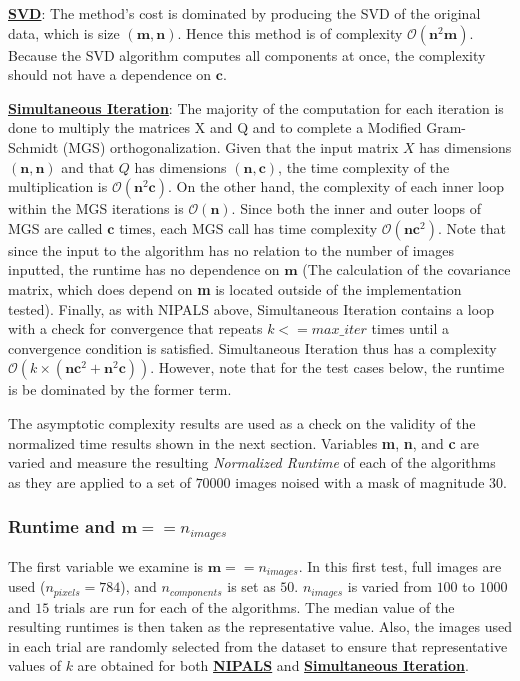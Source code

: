 \documentclass[12pt]{article}
\begin{document}
\textbf{\hyperref[3.2]{SVD}}: The method's cost is dominated by producing the SVD of the original data, which is size $(\textbf{m}, \textbf{n})$. Hence this method is of complexity $\mathcal{O}(\textbf{n}^2 \textbf{m})$. Because the SVD algorithm computes all components at once, the complexity should not have a dependence on $\textbf{c}$.

\textbf{\hyperref[3.3]{Simultaneous Iteration}}: The majority of the computation for each iteration is done to multiply the matrices X and Q and to complete a Modified Gram-Schmidt (MGS) orthogonalization. Given that the input matrix $X$ has dimensions $(\textbf{n}, \textbf{n})$ and that $Q$ has dimensions $(\textbf{n}, \textbf{c})$, the time complexity of the multiplication is $\mathcal{O}(\textbf{n}^2\textbf{c}).$ On the other hand, the complexity of each inner loop within the MGS iterations is $\mathcal{O}(\textbf{n})$. Since both the inner and outer loops of MGS are called $\textbf{c}$ times, each MGS call has time complexity $\mathcal{O}(\textbf{n}\textbf{c}^2)$. Note that since the input to the algorithm has no relation to the number of images inputted, the runtime has no dependence on $\textbf{m}$ (The calculation of the covariance matrix, which does depend on \textbf{m} is located outside of the implementation tested). Finally, as with NIPALS above, Simultaneous Iteration contains a loop with a check for convergence that repeats $k <=max\_iter$ times until a convergence condition is satisfied. Simultaneous Iteration thus has a complexity $\mathcal{O}(k \times (\textbf{n}\textbf{c}^2 + \textbf{n}^2\textbf{c}))$. However, note that for the test cases below, the runtime is be dominated by the former term.

The asymptotic complexity results are used as a check on the validity of the normalized time results shown in the next section. Variables \textbf{m}, \textbf{n}, and \textbf{c} are varied and measure the resulting \textit{Normalized Runtime} of each of the algorithms as they are applied to a set of $70000$ images noised with a mask of magnitude $30$.

\subsubsection{Runtime and $\textbf{m} == n_{images}$}\label{5.1.2}

The first variable we examine is $\textbf{m} == n_{images}$. In this first test, full images are used ($n_{pixels}=784$), and $n_{components}$ is set as $50$. $n_{images}$ is varied from $100$ to $1000$ and $15$ trials are run for each of the algorithms. The median value of the resulting runtimes is then taken as the representative value. Also, the images used in each trial are randomly selected from the dataset to ensure that representative values of $k$ are obtained for both \textbf{\hyperref[3.1]{NIPALS}} and \textbf{\hyperref[3.3]{Simultaneous Iteration}}.
\end{document}
